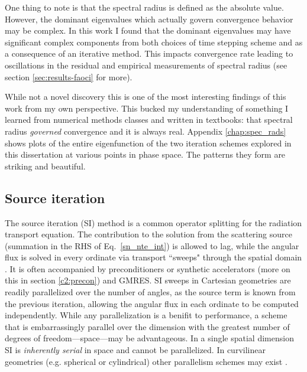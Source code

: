 One thing to note is that the spectral radius is defined as the absolute value.
However, the dominant eigenvalues which actually govern convergence behavior may be complex.
In this work I found that the dominant eigenvalues may have significant complex components from both choices of time stepping scheme \cite{ilham_phd, ilham} and as a consequence of an iterative method.
This impacts convergence rate leading to oscillations in the residual and empirical measurements of spectral radius (see section \ref{sec:results-faoci} for more).

While not a novel discovery \cite{anistratov_iterative_2015} this is one of the most interesting findings of this work from my own perspective.
This bucked my understanding of something I learned from numerical methods classes and written in textbooks:
that spectral radius \emph{governed} convergence and it is always real.
Appendix \ref{chap:spec_rads} shows plots of the entire eigenfunction of the two iteration schemes explored in this dissertation at various points in phase space.
The patterns they form are striking and beautiful.

\subsection{Source iteration}
\label{c2:source_iterations}

The source iteration (SI) method is a common operator splitting for the radiation transport equation.
The contribution to the solution from the scattering source (summation in the RHS of Eq.~\eqref{sn_nte_int}) is allowed to lag, while the angular flux is solved in every ordinate via transport ``sweeps" through the spatial domain \cite{lewis_computational_1984}.
It is often accompanied by preconditioners or synthetic accelerators (more on this in section \ref{c2:precon}) and GMRES.
SI sweeps in Cartesian geometries are readily parallelized over the number of angles, as the source term is known from the previous iteration, allowing the angular flux in each ordinate to be computed independently.
While any parallelization is a benifit to performance, a scheme that is embarrassingly parallel over the dimension with the greatest number of degrees of freedom---space---may be advantageous.
In a single spatial dimension SI is \textit{inherently serial} in space and cannot be parallelized.
In curvilinear geometries (e.g. spherical or cylindrical) other parallelism schemes may exist \cite{palmer_phd}.

